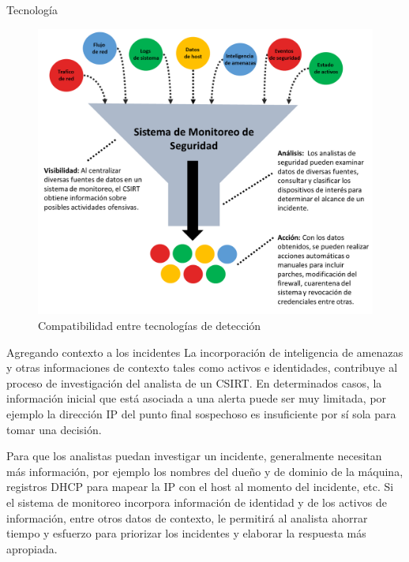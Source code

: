 \begin{section}{Tecnología}
        \begin{figure}[H]
            \centering
            \includegraphics[width=1\textwidth]{./marco_teorico_imagenes/figura_3_compatibilidad_entre_tecnologias.png}
            \caption{Compatibilidad entre tecnologías de detección}
            \label{fig:comp_tech}
        \end{figure}
        \FloatBarrier
        \begin{subsection}{Agregando contexto a los incidentes}
        La incorporación de inteligencia de amenazas y otras informaciones de contexto tales como activos e identidades, contribuye al proceso de investigación del analista de un CSIRT. En determinados casos, la información inicial que está asociada a una alerta puede ser muy limitada, por ejemplo la dirección IP del punto final sospechoso es insuficiente por sí sola para tomar una decisión. \par
        Para que los analistas puedan investigar un incidente, generalmente necesitan más información, por ejemplo los nombres del dueño y de dominio de la máquina, registros DHCP para mapear la IP con el host al momento del incidente, etc. Si el sistema de monitoreo incorpora información de identidad y de los activos de información, entre otros datos de contexto, le permitirá al analista ahorrar tiempo y esfuerzo para priorizar los incidentes y elaborar la respuesta más apropiada.\par


\end{subsection}
\end{section}
